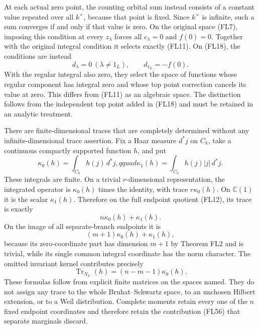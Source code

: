 \documentclass[
  10pt,
]{article}
\begin{document}
At each actual zero point, the counting orbital sum instead consists of
a constant value repeated over all \(k^\times\), because that point is
fixed. Since \(k^\times\) is infinite, such a sum converges if and only
if that value is zero. On the original space (FL7), imposing this
condition at every \(z_\lambda\) forces all \(c_\lambda=0\) and
\(f(0)=0\). Together with the original integral condition it selects
exactly (FL11). On (FL18), the conditions are instead \[
d_\lambda=0\ (\lambda\ne1_L),\qquad d_{1_L}=-f(0).
\tag{FL52}
\] With the regular integral also zero, they select the space of
functions whose regular component has integral zero and whose top point
correction cancels its value at zero. This differs from (FL11) as an
algebraic space. The distinction follows from the independent top point
added in (FL18) and must be retained in an analytic treatment.

There are finite-dimensional traces that are completely determined
without any infinite-dimensional trace assertion. Fix a Haar measure
\(d^*j\) on \(C_k\), take a continuous compactly supported function
\(h\), and put \[
\kappa_0(h)=\int_{C_k}h(j)\,d^*j,qquad
\kappa_1(h)=\int_{C_k}h(j)|j|\,d^*j.
\tag{FL53}
\] These integrals are finite. On a trivial \(r\)-dimensional
representation, the integrated operator is \(\kappa_0(h)\) times the
identity, with trace \(r\kappa_0(h)\). On \(\mathbb C(1)\) it is the
scalar \(\kappa_1(h)\). Therefore on the full endpoint quotient (FL12),
its trace is exactly \[
n\kappa_0(h)+\kappa_1(h).
\tag{FL54}
\] On the image of all separate-branch endpoints it is \[
(m+1)\kappa_0(h)+\kappa_1(h),
\tag{FL55}
\] because its zero-coordinate part has dimension \(m+1\) by Theorem FL2
and is trivial, while its single common integral coordinate has the norm
character. The omitted invariant kernel contributes precisely \[
\operatorname{Tr}_{N_L}(h)=(n-m-1)\kappa_0(h).
\tag{FL56}
\] These formulas follow from explicit finite matrices on the spaces
named. They do not assign any trace to the whole Bruhat--Schwartz space,
to an unchosen Hilbert extension, or to a Weil distribution. Complete
moments retain every one of the \(n\) fixed endpoint coordinates and
therefore retain the contribution (FL56) that separate marginals
discard.
\end{document}
